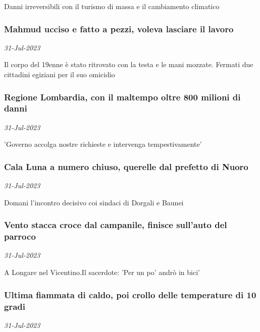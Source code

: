 Danni irreversibili con il turismo di massa e il cambiamento climatico
\subsubsection{Mahmud ucciso e fatto a pezzi, voleva lasciare il lavoro \href{https://www.ansa.it/sito/notizie/cronaca/2023/07/31/mahmud-ucciso-e-fatto-a-pezzi-voleva-lasciare-il-lavoro_cd009e32-3c2a-4948-8a24-9c1462d7f365.html}{}}
\textit{31-Jul-2023}

Il corpo del 19enne \`{e} stato ritrovato con la testa e le mani mozzate. Fermati due cittadini egiziani per il suo omicidio
\subsubsection{Regione Lombardia, con il maltempo oltre 800 milioni di danni \href{https://www.ansa.it/sito/notizie/cronaca/2023/07/31/regione-lombardia-con-il-maltempo-oltre-800-milioni-di-danni_94205a8c-de69-461b-9755-06cd13553402.html}{}}
\textit{31-Jul-2023}

'Governo accolga nostre richieste e intervenga tempestivamente'
\subsubsection{Cala Luna a numero chiuso, querelle dal prefetto di Nuoro \href{https://www.ansa.it/sito/notizie/cronaca/2023/07/31/cala-luna-a-numero-chiuso-querelle-dal-prefetto-di-nuoro_73a122cb-8ffb-4135-8906-d86b7d32fe1a.html}{}}
\textit{31-Jul-2023}

Domani l'incontro decisivo coi sindaci di Dorgali e Baunei
\subsubsection{Vento stacca croce dal campanile, finisce sull'auto del parroco \href{https://www.ansa.it/sito/notizie/cronaca/2023/07/31/vento-stacca-croce-dal-campanile-finisce-sullauto-del-parroco_8764ab92-1e60-4664-b016-d997d804f8da.html}{}}
\textit{31-Jul-2023}

A Longare nel Vicentino.Il sacerdote: 'Per un po' andr\`{o} in bici'
\subsubsection{Ultima fiammata di caldo, poi crollo delle temperature di 10 gradi \href{https://www.ansa.it/sito/notizie/cronaca/2023/07/31/ultima-fiammata-di-caldo-poi-crollo-delle-temperature-di-10-gradi_be1b244a-a0f4-459c-9d15-9f709bb8de13.html}{}}
\textit{31-Jul-2023}

